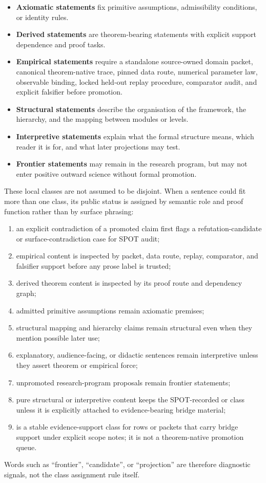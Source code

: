 \begin{itemize}
\item \textbf{Axiomatic statements} fix primitive assumptions, admissibility
      conditions, or identity rules.
\item \textbf{Derived statements} are theorem-bearing statements with explicit support
      dependence and proof tasks.
\item \textbf{Empirical statements} require a standalone source-owned domain
      packet, canonical theorem-native trace, pinned data route, numerical
      parameter law, observable binding, locked held-out replay procedure,
      comparator audit, and explicit falsifier before promotion.
\item \textbf{Structural statements} describe the organisation of the framework,
      the hierarchy, and the mapping between modules or levels.
\item \textbf{Interpretive statements} explain what the formal structure means,
      which reader it is for, and what later projections may test.
\item \textbf{Frontier statements} may remain in the research program, but may
      not enter positive outward science without formal promotion.
\end{itemize}
These local classes are not assumed to be disjoint. When a sentence could fit
more than one class, its public status is assigned by semantic role and proof
function rather than by surface phrasing:
\begin{enumerate}
\item an explicit contradiction of a promoted claim first flags a
      refutation-candidate or surface-contradiction case for SPOT audit;
\item empirical content is inspected by packet, data route, replay,
      comparator, and falsifier support before any prose label is trusted;
\item derived theorem content is inspected by its proof route and dependency
      graph;
\item admitted primitive assumptions remain axiomatic premises;
\item structural mapping and hierarchy claims remain structural even when
      they mention possible later use;
\item explanatory, audience-facing, or didactic sentences remain interpretive
      unless they assert theorem or empirical force;
\item unpromoted research-program proposals remain frontier statements;
\item pure structural or interpretive content keeps the SPOT-recorded
       or  class unless it is explicitly
      attached to evidence-bearing bridge material;
\item {} is a stable evidence-support class for rows or
      packets that carry bridge support under explicit scope notes; it is not a
      theorem-native promotion queue.
\end{enumerate}
Words such as ``frontier'', ``candidate'', or ``projection'' are therefore
diagnostic signals, not the class assignment rule itself.


